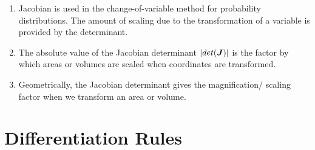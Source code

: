 \begin{enumerate}
\begin{enumerate}
        \item Jacobian is used in the change-of-variable method for probability distributions. 
        The amount of scaling due to the transformation of a variable is provided by the determinant.
        \hfill \cite{mfml/book/mml/Deisenroth-Faisal-Ong}

        \item The absolute value of the Jacobian determinant $\left| det(\bm{J}) \right|$ is the factor by which areas or volumes are scaled when coordinates are transformed.
        \hfill \cite{mfml/book/mml/Deisenroth-Faisal-Ong}

        \item Geometrically, the Jacobian determinant gives the magnification/ scaling factor when we transform an area or volume.
        \hfill \cite{mfml/book/mml/Deisenroth-Faisal-Ong}
    \end{enumerate}

\end{enumerate}

















\section{Differentiation Rules}

